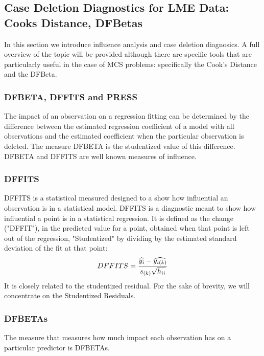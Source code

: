\documentclass[12pt, a4paper]{report}
\theoremstyle{plain}
\theoremstyle{definition}
\theoremstyle{remark}
\begin{document}
	
\subsection*{Case Deletion Diagnostics for LME Data: Cooks Distance, DFBetas}

	In this section we introduce influence analysis and case deletion diagnosics. A full overview of the topic will be provided although there are specific tools that are particularly useful in the case of MCS problems: specifically the Cook's Distance and the DFBeta.

	

	\subsubsection{DFBETA, DFFITS and PRESS}
	The impact of an observation on a regression fitting can be determined by the difference between the estimated regression coefficient of a model with all observations and the estimated coefficient when the particular observation is deleted. The measure DFBETA is the studentized value of this difference.
	DFBETA and DFFITS are well known measures of influence. 
	

\subsubsection{DFFITS} %
	DFFITS is a statistical measured designed to a show how influential an observation is in a statistical model. DFFITS is a diagnostic meant to show how influential a point is in a statistical regression. It is defined as the change ("DFFIT"), in the predicted value for a point, obtained when that point is left out of the regression, "Studentized" by dividing by the estimated standard deviation of the fit at that point:
	\begin{displaymath} DFFITS = {\widehat{y_i} -
		\widehat{y_{i(k)}} \over s_{(k)} \sqrt{h_{ii}}} \end{displaymath}
	It is closely related to the studentized residual. For the sake of brevity, we will concentrate on the Studentized Residuals.
	
	\subsubsection{DFBETAs}
	The measure that measures how much impact each observation has on a particular predictor is DFBETAs.
	
\end{document}
